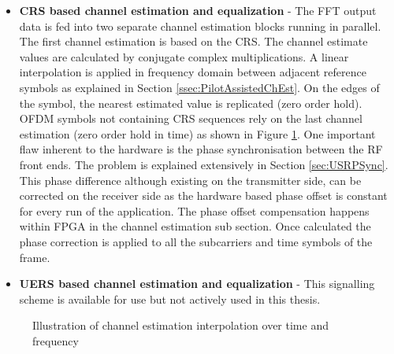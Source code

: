 \begin{itemize}
    \item \textbf{CRS based channel estimation and equalization} -
        The FFT output data is fed into two separate channel estimation blocks running in parallel. The first channel estimation is based on the CRS. The channel estimate values are calculated by conjugate complex multiplications. A linear interpolation is applied in frequency domain between adjacent reference symbols as explained in Section \ref{ssec:PilotAssistedChEst}. On the edges of the symbol, the nearest estimated value is replicated (zero order hold). OFDM symbols not containing CRS sequences rely on the last channel estimation (zero order hold in time) as shown in Figure \ref{fig:ChEstInterpolation}.
        One important flaw inherent to the hardware is the phase synchronisation between the RF front ends. The problem is explained extensively in Section \ref{sec:USRPSync}. This phase difference although existing on the transmitter side, can be corrected on the receiver side as the hardware based phase offset is constant for every run of the application. The phase offset compensation happens within FPGA in the channel estimation sub section. Once calculated the phase correction is applied to all the subcarriers and time symbols of the frame.
    \item \textbf{UERS based channel estimation and equalization} -
        This signalling scheme is available for use but not actively used in this thesis.
\end{itemize}

\begin{figure}%
    \centering
    \qquad
    \caption{Illustration of channel estimation interpolation over time and frequency}%
    \label{fig:ChEstInterpolation}%
\end{figure}


